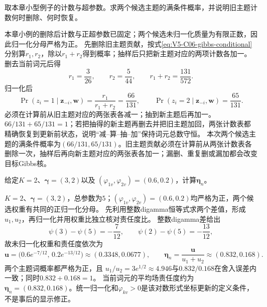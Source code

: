 \label{struct:V5-C06-CH32}
\begin{example}[一次折叠Gibbs更新]\label{exm:V5-C06-gibbs-step}
取本章小型例子的计数与超参数。求两个候选主题的满条件概率，并说明旧主题计数何时删除、何时恢复。
\end{example}
\begin{solution}
\SolGiven 本章小例的删除后计数与正超参数已固定；两个候选未归一化质量为有限正数，因此归一化分母严格为正。
\SolPlan 先删除旧主题贡献，按式\eqref{eq:V5-C06-gibbs-conditional}分别算$r_1,r_2$，除以$r_1+r_2$得到概率；抽样后只把新主题对应的两项计数各加一。
\SolDerive 删去当前词元后得
\[
r_1=\frac3{26},\qquad r_2=\frac5{44},\qquad
r_1+r_2=\frac{131}{572}.
\]
归一化后
\[
\Pr(z_i=1\mid\boldsymbol z_{-i},\boldsymbol w)
=\frac{r_1}{r_1+r_2}=\frac{66}{131},\qquad
\Pr(z_i=2\mid\boldsymbol z_{-i},\boldsymbol w)=\frac{65}{131}.
\]
必须在计算前从旧主题对应的两张表各减一；抽到新主题后再加一。
\SolCheck $66/131+65/131=1$；若把抽得的新主题再删去并把旧主题加回，两张计数表都精确恢复到更新前状态，说明“减--算--抽--加”保持词元总数守恒。
\SolAnswer 本次两个候选主题的满条件概率为$(66/131,65/131)$。旧主题贡献必须在计算前从两张计数表各删除一次，抽样后再向新主题对应的两张表各加一；漏删、重复删或漏加都会改变目标Gibbs核。
\end{solution}
\begin{example}[一次平均场责任度更新]\label{exm:V5-C06-vi-step}
给定$K=2$、$\boldsymbol\gamma=(3,2)$以及
$(\varphi_{1v},\varphi_{2v})=(0.6,0.2)$，计算$\boldsymbol\eta_n$。
\end{example}
\begin{solution}
\SolGiven $K=2$、$\boldsymbol\gamma=(3,2)$，总参数为$5$；$(\varphi_{1v},\varphi_{2v})=(0.6,0.2)$均严格为正，两个候选权重有共同的正归一化分母。
\SolPlan 先利用整数digamma恒等式求两个差值，形成$u_1,u_2$，再归一化并用权重比独立核对责任度比。
\SolDerive 整数digamma差给出
\[
\psi(3)-\psi(5)=-\frac7{12},\qquad
\psi(2)-\psi(5)=-\frac{13}{12},
\]
故未归一化权重和责任度依次为
\[
\boldsymbol u
=\bigl(0.6e^{-7/12},\,0.2e^{-13/12}\bigr)
\approx(0.3348,0.0677),\qquad
\boldsymbol\eta_n
=\frac{\boldsymbol u}{u_1+u_2}
\approx(0.832,0.168).
\]
\SolCheck 两个主题词概率都严格为正，且
$u_1/u_2=3e^{1/2}\approx4.946$与$0.832/0.168$在舍入误差内一致；同时$0.832+0.168=1$。
\SolAnswer 当前词元的平均场责任度约为$\boldsymbol\eta_n=(0.832,0.168)$。统一归一化和$\varphi_{kv}>0$是该对数形式坐标更新的定义条件，不是事后的显示修正。
\end{solution}
